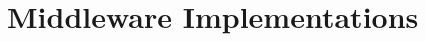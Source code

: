 \appendix
\label{sec:appendix}

\chapter{Middleware Implementations}
\label{sec:apdx-middleware-implementations}




